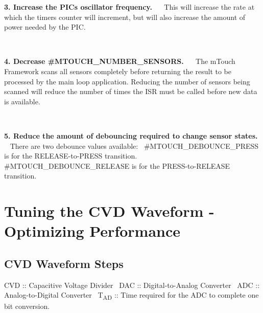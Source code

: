 \begin{DoxyItemize}
\item {\bfseries 3. Increase the P\+I\+C\textquotesingle{}s oscillator frequency.}~\newline
~\newline
 This will increase the rate at which the timer\textquotesingle{}s counter will increment, but will also increase the amount of power needed by the P\+I\+C.\end{DoxyItemize}
~\newline


\begin{DoxyItemize}
\item {\bfseries 4. Decrease \#\+M\+T\+O\+U\+C\+H\+\_\+\+N\+U\+M\+B\+E\+R\+\_\+\+S\+E\+N\+S\+O\+R\+S.}~\newline
~\newline
 The m\+Touch Framework scans all sensors completely before returning the result to be processed by the main loop application. Reducing the number of sensors being scanned will reduce the number of times the I\+S\+R must be called before new data is available.\end{DoxyItemize}
~\newline


\begin{DoxyItemize}
\item {\bfseries 5. Reduce the amount of debouncing required to change sensor states.}~\newline
~\newline
 There are two debounce values available\+:~\newline
 \#\+M\+T\+O\+U\+C\+H\+\_\+\+D\+E\+B\+O\+U\+N\+C\+E\+\_\+\+P\+R\+E\+S\+S is for the R\+E\+L\+E\+A\+S\+E-\/to-\/\+P\+R\+E\+S\+S transition.~\newline
 \#\+M\+T\+O\+U\+C\+H\+\_\+\+D\+E\+B\+O\+U\+N\+C\+E\+\_\+\+R\+E\+L\+E\+A\+S\+E is for the P\+R\+E\+S\+S-\/to-\/\+R\+E\+L\+E\+A\+S\+E transition. \end{DoxyItemize}
\hypertarget{ts-Waveform}{}\section{Tuning the C\+V\+D Waveform -\/ Optimizing Performance}\label{ts-Waveform}
\hypertarget{ts-_waveform_mTouch}{}\subsection{C\+V\+D Waveform Steps}\label{ts-_waveform_mTouch}
{\ttfamily C\+V\+D \+:\+: Capacitive Voltage Divider}~\newline
 {\ttfamily D\+A\+C \+:\+: Digital-\/to-\/\+Analog Converter}~\newline
 {\ttfamily A\+D\+C \+:\+: Analog-\/to-\/\+Digital Converter}~\newline
 {\ttfamily T\textsubscript{A\+D} \+:\+: Time required for the A\+D\+C to complete one bit conversion.}~\newline
~\newline



